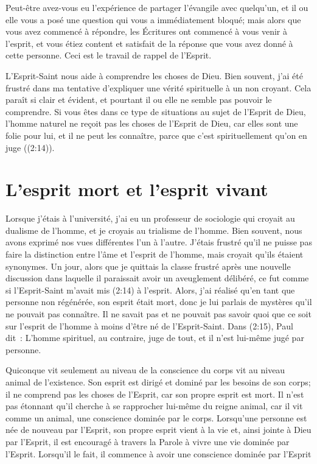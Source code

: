 Peut-être avez-vous eu l'expérience de partager l'évangile avec quelqu'un,
 et il ou elle vous a posé une question qui vous a immédiatement bloqué;
 mais alors que vous avez commencé à répondre, les Écritures ont commencé
 à vous venir à l'esprit, et vous étiez content et satisfait de la réponse
 que vous avez donné à cette personne. Ceci est le travail de rappel de l'Esprit.

L'Esprit-Saint nous aide à comprendre les choses de Dieu.
 Bien souvent, j'ai été frustré dans ma tentative d'expliquer
 une vérité spirituelle à un non croyant.
 Cela paraît si clair et évident, et pourtant il ou elle ne semble pas
 pouvoir le comprendre.
 Si vous êtes dans ce type de situations au sujet de l'Esprit de Dieu,
 l'homme naturel \og ne reçoit pas les choses de l'Esprit de Dieu,
 car elles sont une folie pour lui, et il ne peut les connaître, 
 parce que c'est spirituellement qu'on en juge \fg{}
 ((2:14)).


\section*{L'esprit mort et l'esprit vivant}

Lorsque j'étais à l'université, j'ai eu un professeur de sociologie
 qui croyait au dualisme de l'homme, et je croyais au trialisme de l'homme.
 Bien souvent, nous avons exprimé nos vues différentes l'un à l'autre.
 J'étais frustré qu'il ne puisse pas faire la distinction entre l'âme
 et l'esprit de l'homme, mais croyait qu'ils étaient synonymes.
 Un jour, alors que je quittais la classe frustré
 après une nouvelle discussion dans laquelle il paraissait
 avoir un aveuglement délibéré, ce fut comme si l'Esprit-Saint
 m'avait mis (2:14) à l'esprit.
 Alors, j'ai réalisé qu'en tant que personne non régénérée,
 son esprit était mort, donc je lui parlais de mystères qu'il ne pouvait
 pas connaître.
 Il ne savait pas et ne pouvait pas savoir quoi que ce soit sur l'esprit
 de l'homme à moins d'être né de l'Esprit-Saint.
 Dans (2:15), Paul dit~:
 \og L'homme spirituel, au contraire, juge de tout,
 et il n'est lui-même jugé par personne. \fg{}

Quiconque vit seulement au niveau de la conscience du corps
 vit au niveau animal de l'existence.
 Son esprit est dirigé et dominé par les besoins de son corps;
 il ne comprend pas les choses de l'Esprit, car son propre esprit est mort.
 Il n'est pas étonnant qu'il cherche à se rapprocher lui-même
 du reigne animal, car il vit comme un animal,
 une conscience dominée par le corps.
 Lorsqu'une personne est née de nouveau par l'Esprit,
 son propre esprit vient à la vie et, ainsi jointe à Dieu par l'Esprit,
 il est encouragé à travers la Parole à vivre une vie dominée par l'Esprit.
 Lorsqu'il le fait, il commence à avoir une conscience dominée par l'Esprit


